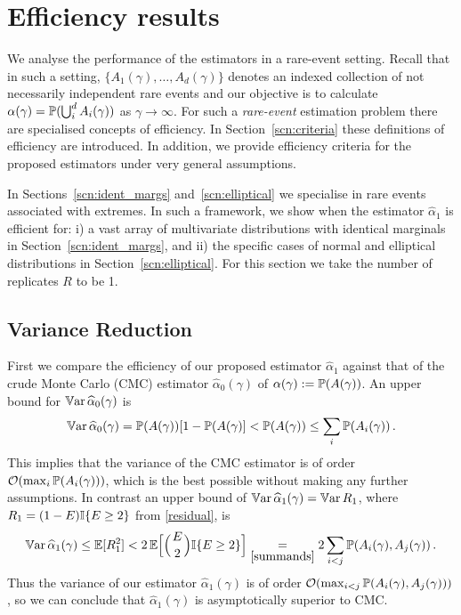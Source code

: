 \section{Efficiency results} \label{scn:efficiency_results}

We analyse the performance of the estimators in a rare-event
setting.  Recall that in such a setting, $\{A_1(\gamma),\dots,A_d(\gamma)\}$ denotes
an indexed collection of not necessarily independent rare events and our objective is to
calculate $\alpha(\gamma)=\operatorname{{\mathbb P}}(\bigcup_{i}^d A_i(\gamma))$ as $\gamma\to\infty$.
For such a \emph{rare-event} estimation problem there are specialised concepts of efficiency. In Section~\ref{scn:criteria} these definitions of efficiency are introduced. In addition,
we provide efficiency criteria for the proposed estimators under very general assumptions.

In Sections~\ref{scn:ident_margs} and~\ref{scn:elliptical} we specialise in rare events associated with extremes.
In such a framework, we show when the estimator $\hat{\alpha}_1$ is efficient for: i)
a vast array of multivariate distributions with
identical marginals in Section~\ref{scn:ident_margs}, and ii) the specific cases of normal and elliptical distributions in Section~\ref{scn:elliptical}.
For this section we take the number of replicates $R$ to be 1.

\subsection{Variance Reduction} \label{scn:Vreduction}

First we compare the efficiency of our proposed estimator $\hat{\alpha}_1$ against that of
the crude Monte Carlo (CMC) estimator $\hat{\alpha}_0(\gamma)$
of $\alpha(\gamma):=\operatorname{{\mathbb P}}(A(\gamma))$.
An upper bound for $\operatorname{\mathbb{V}\mathrm{ar}} \widehat{\alpha}_0(\gamma)$ is
\begin{equation*}
	\operatorname{\mathbb{V}\mathrm{ar}} \widehat{\alpha}_0(\gamma) = \operatorname{{\mathbb P}}(A(\gamma)) [1 - \operatorname{{\mathbb P}}(A(\gamma)] < \operatorname{{\mathbb P}}( A(\gamma) )
	\le \sum_i \operatorname{{\mathbb P}}(A_i(\gamma)) \,.
\end{equation*}
This implies that the variance of the CMC estimator is of order
${\mathcal{O}}(\max_i \operatorname{{\mathbb P}}(A_i(\gamma)))$,
which is the best possible without making any further assumptions.
In contrast an upper bound of $\operatorname{\mathbb{V}\mathrm{ar}} \widehat{\alpha}_1(\gamma) = \operatorname{\mathbb{V}\mathrm{ar}} R_1$, where $R_1 =(1-E) \mathbb{I}\{ E \ge 2 \}$ from \eqref{residual}, is
\begin{equation}
	\Var\hat{\alpha}_1(\gamma) \le \Exp[R_1^2] < 2 \Exp \Bigl[ \BigBinom{E}{2} \ind{E \ge 2} \Bigr] \underset{\eqref{summands}}{=} 2 \sum_{i<j} \Prob(A_i(\gamma), A_j(\gamma)) \,. \label{Bound}
\end{equation}
Thus the variance of our estimator $\hat{\alpha}_1(\gamma)$ is of order
${\mathcal{O}}(\max_{i<j} \operatorname{{\mathbb P}}(A_i(\gamma), A_j(\gamma)))$,
so we can conclude that $\hat{\alpha}_1(\gamma)$ is asymptotically superior to CMC.

